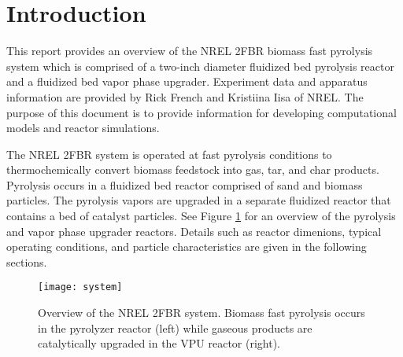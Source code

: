 
\section{Introduction}

This report provides an overview of the NREL 2FBR biomass fast pyrolysis system which is comprised of a two-inch diameter fluidized bed pyrolysis reactor and a fluidized bed vapor phase upgrader. Experiment data and apparatus information are provided by Rick French and Kristiina Iisa of NREL. The purpose of this document is to provide information for developing computational models and reactor simulations.

The NREL 2FBR system is operated at fast pyrolysis conditions to thermochemically convert biomass feedstock into gas, tar, and char products. Pyrolysis occurs in a fluidized bed reactor comprised of sand and biomass particles. The pyrolysis vapors are upgraded in a separate fluidized reactor that contains a bed of catalyst particles. See Figure \ref{fig:system} for an overview of the pyrolysis and vapor phase upgrader reactors. Details such as reactor dimenions, typical operating conditions, and particle characteristics are given in the following sections.

\begin{figure}[H]
    \centering
    \texttt{[image: system]}
    \caption{Overview of the NREL 2FBR system. Biomass fast pyrolysis occurs in the pyrolyzer reactor (left) while gaseous products are catalytically upgraded in the VPU reactor (right).}
    \label{fig:system}
\end{figure}
